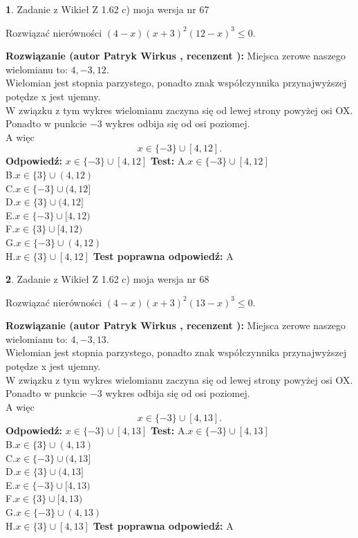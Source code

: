 \documentclass[12pt, a4paper]{article}
\theoremstyle{definition} %
\newtheorem{zad}{}
\newcommand{\zadStart}[1]{\begin{zad}#1\newline}
\newcommand{\zadStop}{\end{zad}}
\newcommand{\rozwStart}[2]{\noindent \textbf{Rozwiązanie (autor #1 , recenzent #2): }\newline}
\newcommand{\rozwStop}{\newline}
\newcommand{\odpStart}{\noindent \textbf{Odpowiedź:}\newline}
\newcommand{\odpStop}{\newline}
\newcommand{\testStart}{\noindent \textbf{Test:}\newline}
\newcommand{\testStop}{\newline}
\newcommand{\kluczStart}{\noindent \textbf{Test poprawna odpowiedź:}\newline}
\newcommand{\kluczStop}{\newline}
\begin{document}
\zadStart{Zadanie z Wikieł Z 1.62 c) moja wersja nr 67}

Rozwiązać nierówności $(4-x)(x+3)^{2}(12-x)^{3}\le0$.
\zadStop
\rozwStart{Patryk Wirkus}{}
Miejsca zerowe naszego wielomianu to: $4, -3, 12$.\\
Wielomian jest stopnia parzystego, ponadto znak współczynnika przy\linebreak najwyższej potędze x jest ujemny.\\ W związku z tym wykres wielomianu zaczyna się od lewej strony powyżej osi OX.\\
Ponadto w punkcie $-3$ wykres odbija się od osi poziomej.\\
A więc $$x \in \{-3\} \cup [4,12].$$
\rozwStop
\odpStart
$x \in \{-3\} \cup [4,12]$
\odpStop
\testStart
A.$x \in \{-3\} \cup [4,12]$\\
B.$x \in \{3\} \cup (4,12)$\\
C.$x \in \{-3\} \cup (4,12]$\\
D.$x \in \{3\} \cup (4,12]$\\
E.$x \in \{-3\} \cup [4,12)$\\
F.$x \in \{3\} \cup [4,12)$\\
G.$x \in \{-3\} \cup (4,12)$\\
H.$x \in \{3\} \cup [4,12]$
\testStop
\kluczStart
A
\kluczStop



\zadStart{Zadanie z Wikieł Z 1.62 c) moja wersja nr 68}

Rozwiązać nierówności $(4-x)(x+3)^{2}(13-x)^{3}\le0$.
\zadStop
\rozwStart{Patryk Wirkus}{}
Miejsca zerowe naszego wielomianu to: $4, -3, 13$.\\
Wielomian jest stopnia parzystego, ponadto znak współczynnika przy\linebreak najwyższej potędze x jest ujemny.\\ W związku z tym wykres wielomianu zaczyna się od lewej strony powyżej osi OX.\\
Ponadto w punkcie $-3$ wykres odbija się od osi poziomej.\\
A więc $$x \in \{-3\} \cup [4,13].$$
\rozwStop
\odpStart
$x \in \{-3\} \cup [4,13]$
\odpStop
\testStart
A.$x \in \{-3\} \cup [4,13]$\\
B.$x \in \{3\} \cup (4,13)$\\
C.$x \in \{-3\} \cup (4,13]$\\
D.$x \in \{3\} \cup (4,13]$\\
E.$x \in \{-3\} \cup [4,13)$\\
F.$x \in \{3\} \cup [4,13)$\\
G.$x \in \{-3\} \cup (4,13)$\\
H.$x \in \{3\} \cup [4,13]$
\testStop
\kluczStart
A
\kluczStop
\end{document}
